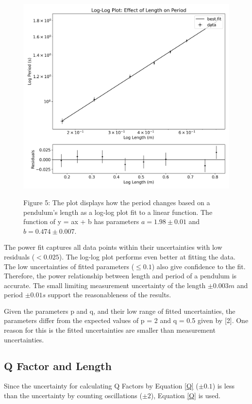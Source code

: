 \documentclass[12pt,twocolumn]{article}
\begin{document}
\begin{figure}[!h]
\begin{centering}
\includegraphics[width=0.5 \textwidth]{images/Log-Log Plot: Effect of Length on Period.png}
\label{fig:LengthPeriodLog}
\caption{Figure 5: The plot displays how the period changes based on a pendulum's length
as a log-log plot fit to a linear function.
The function of y = ax + b has parameters
$a = 1.98 \pm 0.01$ and $b = 0.474 \pm 0.007$.}
\end{centering}
\end{figure}

The power fit captures all data points within their uncertainties with low residuals ($< 0.025$). 
The log-log plot performs even better at fitting the data. The low uncertainties of fitted parameters ($\leq 0.1$)
also give confidence to the fit.
Therefore, the power relationship
between length and period of a pendulum is accurate. The small limiting measurement uncertainty of the length $ \pm 0.003m$ and period $\pm 0.01s$ support the reasonableness of the results.

Given the parameters p and q, and their low range
of fitted uncertainties, the parameters differ from the expected values of p = 2 and
q = 0.5 given by [2]. One reason for this is the fitted uncertainties
are smaller than measurement uncertainties.

\subsection{Q Factor and Length}
Since the uncertainty for calculating Q Factors by Equation \ref{Q} ($\pm 0.1$) is less than
the uncertainty by counting oscillations ($\pm 2$),
Equation \ref{Q} is used.
\end{document}
